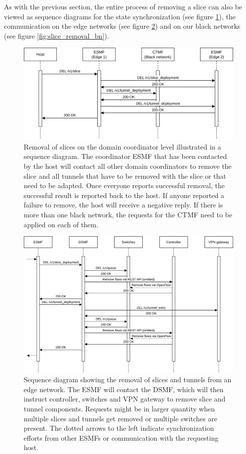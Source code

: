 As with the previous section, the entire process of removing a slice can also be viewed as sequence diagrams for the state synchronization (see figure \ref{fig:slice_removal_synchronization}), the communication on the edge networks (see figure \ref{fig:slice_removal_edge}) and on our black networks (see figure \ref{fig:slice_removal_bn}).

\begin{figure}[H]
  \centering
  \includegraphics[width=\linewidth]{images/chapter_6/slice_removal_coordination.png}
  \caption[Slice removal on the coordinators]{Removal of slices on the domain coordinator level illustrated in a sequence diagram. The coordinator ESMF that has been contacted by the host will contact all other domain coordinators to remove the slice and all tunnels that have to be removed with the slice or that need to be adapted. Once everyone reports successful removal, the successful result is reported back to the host. If anyone reported a failure to remove, the host will receive a negative reply. If there is more than one black network, the requests for the CTMF need to be applied on each of them.}
  \label{fig:slice_removal_synchronization}
\end{figure}
\begin{figure}[H]
  \centering
  \includegraphics[width=\linewidth]{images/chapter_6/slice_removal_edge.png}
  \caption[Slice removal from an edge network]{Sequence diagram showing the removal of slices and tunnels from an edge network. The ESMF will contact the DSMF, which will then instruct controller, switches and VPN gateway to remove slice and tunnel components. Requests might be in larger quantity when multiple slices and tunnels get removed or multiple switches are present. The dotted arrows to the left indicate synchronization efforts from other ESMFs or communication with the requesting host.}
  \label{fig:slice_removal_edge}
\end{figure}
